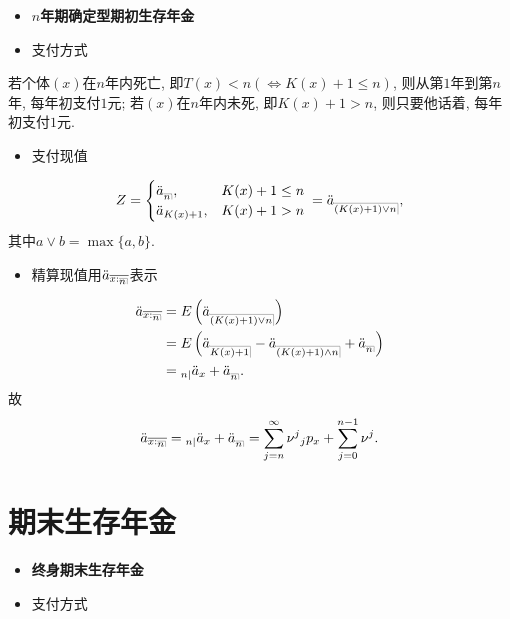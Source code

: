 \documentclass[a4paper,openany, 10pt]{ctexbook}
\makeatletter
\newcommand{\hei}{\CJKfamily{hei}}      %
\def\z{\left}
\def\y{\right}
\DeclareRobustCommand{\annu}[1]{_{%
    \def\arraystretch{0}%
    \setlength\arraycolsep{1pt}%
    \setlength\arrayrulewidth{.2pt}%
    \begin{array}[b]{@{}c|}\hline
        \\[\arraycolsep]%
        \scriptstyle #1%
    \end{array}%
}}
\makeatother
\begin{document}
\begin{itemize}
    \item[{\bf\hei 五.}]{\bf\hei $n$年期确定型期初生存年金}
\end{itemize}

\begin{itemize}
    \item[{\bf\hei1.}] 支付方式
\end{itemize}

若个体$(x)$在$n$年内死亡, 即$T(x)<n(\iff K(x)+1\leq n)$, 则从第$1$年到第$n$年, 每年初支付$1$元; 若$(x)$在$n$年内未死, 即$K(x)+1>n$, 则只要他话着, 每年初支付$1$元.

\begin{itemize}
    \item[{\bf\hei2.}] 支付现值
\end{itemize}
$$
    Z=
    \begin{cases}
        \ddot a_{\annu n}, & K(x)+1\leq n \\
        \ddot a_{K(x)+1},  & K(x)+1>n
    \end{cases}\\
    =\ddot a_{\annu{(K(x)+1)\lor n}},
$$
其中$a\lor b=\max\{a,b\}.$
\begin{itemize}
    \item[{\bf\hei3.}] 精算现值用$\ddot a_{\overline{{x:}{}\annu n}}$表示
\end{itemize}
\begin{align*}
  \ddot a_{\overline{x:\annu n}}&=E\z(\ddot a_{\annu{(K(x)+1)\lor n}}\y)\\
  &=E\z(\ddot a _{\annu{K(x)+1}} - \ddot a_{\annu{(K(x)+1)\land n}} + \ddot a_{\annu n}\y)\\
  &={}_{n|} \ddot a_{x}+\ddot a_{\annu n}.
\end{align*}
故
$$\ddot a_{\overline{x:\annu n}}={}_{n|}\ddot a_{x}+\ddot a_{\annu n}=\sum^{\infty}_{j=n}\nu^{j}{}_{j}p_{x}+\sum^{n-1}_{j=0}\nu^{j}.$$

\section{期末生存年金}
\begin{itemize}
    \item[{\bf\hei 一.}]{\bf\hei 终身期末生存年金}
\end{itemize}

\begin{itemize}
    \item[{\bf\hei 1.}] 支付方式
\end{itemize}
\end{document}
